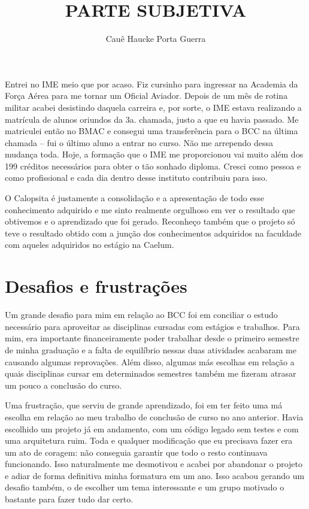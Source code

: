 \documentclass[titlepage,a4paper]{article}
\title{PARTE SUBJETIVA}
\author{Cauê Haucke Porta Guerra}
\newcommand{\calopsita}{Calopsita}
\begin{document}
\maketitle

\newpage
Entrei no IME meio que por acaso. Fiz cursinho para ingressar na Academia da Força Aérea para me tornar um Oficial Aviador. Depois de um mês de rotina militar acabei desistindo daquela carreira e, por sorte, o IME estava realizando a matrícula de alunos oriundos da 3a. chamada, justo a que eu havia passado. Me matriculei então no BMAC e consegui uma transferência para o BCC na última chamada -- fui o último aluno a entrar no curso. Não me arrependo dessa mudança toda. Hoje, a formação que o IME me proporcionou vai muito além dos 199 créditos necessários para obter o tão sonhado diploma. Cresci como pessoa e como profissional e cada dia dentro desse instituto contribuiu para isso.

O \calopsita{} é justamente a consolidação e a apresentação de todo esse conhecimento adquirido e me sinto realmente orgulhoso em ver o resultado que obtivemos e o aprendizado que foi gerado. Reconheço também que o projeto só teve o resultado obtido com a junção dos conhecimentos adquiridos na faculdade com aqueles adquiridos no estágio na Caelum.

\section{Desafios e frustrações}

Um grande desafio para mim em relação ao BCC foi em conciliar o estudo necessário para aproveitar as disciplinas cursadas com estágios e trabalhos. Para mim, era importante financeiramente poder trabalhar desde o primeiro semestre de minha graduação e a falta de equilíbrio nessas duas atividades acabaram me causando algumas reprovações. Além disso, algumas más escolhas em relação a quais disciplinas cursar em determinados semestres também me fizeram atrasar um pouco a conclusão do curso.

Uma frustração, que serviu de grande aprendizado, foi em ter feito uma má escolha em relação ao meu trabalho de conclusão de curso no ano anterior. Havia escolhido um projeto já em andamento, com um código legado sem testes e com uma arquitetura ruim. Toda e qualquer modificação que eu precisava fazer era um ato de coragem: não conseguia garantir que todo o resto continuava funcionando. Isso naturalmente me desmotivou e acabei por abandonar o projeto e adiar de forma definitiva minha formatura em um ano. Isso acabou gerando um desafio também, o de escolher um tema interessante e um grupo motivado o bastante para fazer tudo dar certo.
\end{document}
